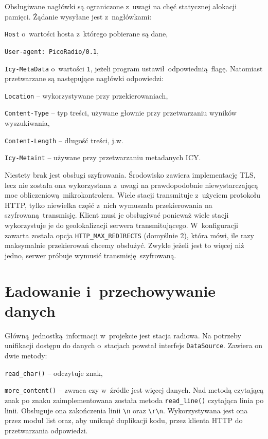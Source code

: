 \documentclass[polish]{aghengthesis}
\let\tempone\itemize
\let\temptwo\enditemize
\renewenvironment{itemize}{\tempone\setlength{\itemsep}{0cm}}{\temptwo}
\begin{document}
		Obsługiwane nagłówki są ograniczone z~uwagi na chęć statycznej alokacji pamięci. Żądanie wysyłane jest z~nagłówkami:
		\begin{itemize}
			\item \lstinline|Host| o~wartości hosta z~którego pobierane są dane,
			\item \lstinline|User-agent: PicoRadio/0.1|,
			\item \lstinline|Icy-MetaData| o~wartości \lstinline|1|, jeżeli program ustawił odpowiednią flagę.
		\end{itemize}
		Natomiast przetwarzane są następujące nagłówki odpowiedzi:
		\begin{itemize}
			\item \lstinline|Location| -- wykorzystywane przy przekierowaniach,
			\item \lstinline|Content-Type| -- typ treści, używane głownie przy przetwarzaniu wyników wyszukiwania,
			\item \lstinline|Content-Length| -- długość treści, j.w.
			\item \lstinline|Icy-Metaint| -- używane przy przetwarzaniu metadanych ICY.
		\end{itemize}
		
		Niestety brak jest obsługi szyfrowania. Środowisko zawiera implementację TLS, lecz nie została ona wykorzystana z~uwagi na prawdopodobnie niewystarczającą moc obliczeniową mikrokontrolera. Wiele stacji transmituje z~użyciem protokołu HTTP, tylko niewielka część z~nich wymuszała przekierowania na szyfrowaną transmisję. Klient musi je obsługiwać ponieważ wiele stacji wykorzystuje je do geolokalizacji serwera transmitującego. W~konfiguracji zawarta została opcja \lstinline|HTTP_MAX_REDIRECTS| (domyślnie 2), która mówi, ile razy maksymalnie przekierowań chcemy obsłużyć. Zwykle jeżeli jest to więcej niż jedno, serwer próbuje wymusić transmisję szyfrowaną.
		
	\section{Ładowanie i~przechowywanie danych}
		Główną jednostką informacji w~projekcie jest stacja radiowa. Na potrzeby unifikacji dostępu do danych o~stacjach powstał interfejs \lstinline|DataSource|. Zawiera on dwie metody:
		\begin{itemize}
			\item \lstinline|read_char()| -- odczytuje znak,
			\item \lstinline|more_content()| -- zwraca czy w~źródle jest więcej danych.
		\end{itemize}
		Nad metodą czytającą znak po znaku zaimplementowana została metoda \lstinline|read_line()| czytająca linia po linii. Obsługuje ona zakończenia linii \lstinline|\n| oraz \lstinline|\r\n|. Wykorzystywana jest ona przez moduł list oraz, aby uniknąć duplikacji kodu, przez klienta HTTP do przetwarzania odpowiedzi.
		
\end{document}
